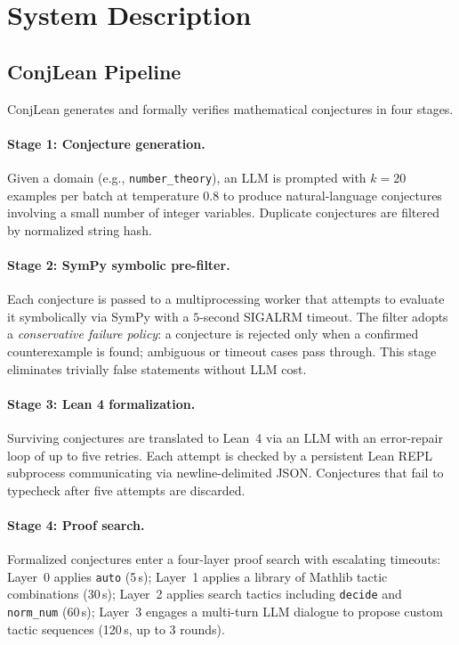 \section{System Description}
\label{sec:system}

\subsection{ConjLean Pipeline}

ConjLean generates and formally verifies mathematical conjectures in four stages.

\paragraph{Stage 1: Conjecture generation.}
Given a domain (e.g., \texttt{number\_theory}), an LLM is prompted with
$k=20$ examples per batch at temperature $0.8$ to produce natural-language
conjectures involving a small number of integer variables.
Duplicate conjectures are filtered by normalized string hash.

\paragraph{Stage 2: SymPy symbolic pre-filter.}
Each conjecture is passed to a multiprocessing worker that attempts to
evaluate it symbolically via SymPy with a $5$-second SIGALRM timeout.
The filter adopts a \emph{conservative failure policy}: a conjecture is
rejected only when a confirmed counterexample is found; ambiguous or
timeout cases pass through.
This stage eliminates trivially false statements without LLM cost.

\paragraph{Stage 3: Lean 4 formalization.}
Surviving conjectures are translated to Lean~4 via an LLM with an error-repair
loop of up to five retries.
Each attempt is checked by a persistent Lean REPL subprocess communicating via
newline-delimited JSON.
Conjectures that fail to typecheck after five attempts are discarded.

\paragraph{Stage 4: Proof search.}
Formalized conjectures enter a four-layer proof search with escalating
timeouts: Layer~0 applies \texttt{auto} (5\,s); Layer~1 applies a library of
Mathlib tactic combinations (30\,s); Layer~2 applies search tactics including
\texttt{decide} and \texttt{norm\_num} (60\,s); Layer~3 engages a multi-turn
LLM dialogue to propose custom tactic sequences (120\,s, up to 3 rounds).

